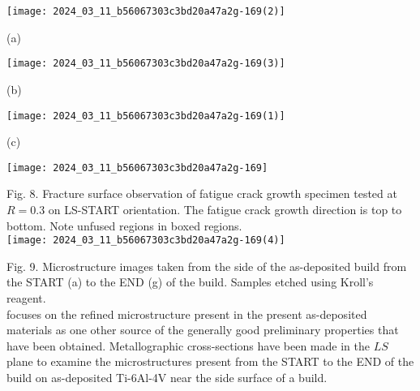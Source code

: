 \documentclass[10pt]{article}
\begin{document}
\begin{center}
\texttt{[image: 2024\_03\_11\_b56067303c3bd20a47a2g-169(2)]}
\end{center}

(a)

\begin{center}
\texttt{[image: 2024\_03\_11\_b56067303c3bd20a47a2g-169(3)]}
\end{center}

(b)

\begin{center}
\texttt{[image: 2024\_03\_11\_b56067303c3bd20a47a2g-169(1)]}
\end{center}

(c)

\begin{center}
\texttt{[image: 2024\_03\_11\_b56067303c3bd20a47a2g-169]}
\end{center}

Fig. 8. Fracture surface observation of fatigue crack growth specimen tested at $R=0.3$ on LS-START orientation. The fatigue crack growth direction is top to bottom. Note unfused regions in boxed regions.\\
\texttt{[image: 2024\_03\_11\_b56067303c3bd20a47a2g-169(4)]}

Fig. 9. Microstructure images taken from the side of the as-deposited build from the START (a) to the END (g) of the build. Samples etched using Kroll's reagent.\\
focuses on the refined microstructure present in the present as-deposited materials as one other source of the generally good preliminary properties that have been obtained. Metallographic cross-sections have been made in the $L S$ plane to examine the microstructures present from the START to the END of the build on as-deposited Ti-6Al-4V near the side surface of a build.
\end{document}
